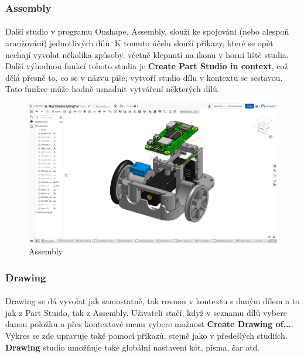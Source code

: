 \documentclass[12pt]{article}
\begin{document}
\begin{spacing}{1.5}
	\subsubsection*{Assembly}
	\paragraph{} Další studio v programu Onshape, Assembly, slouží ke spojování (nebo alespoň aranžování) jednotlivých dílů. K tomuto účelu slouží příkazy, které se opět nechají vyvolat několika způsoby, včetně klepnutí na ikonu v horní liště studia. Další výhodnou funkcí tohoto studia je \textbf{Create Part Studio in context}, což dělá přesně to, co se v názvu píše; vytvoří studio dílu v kontextu se sestavou. Tato funkce může hodně usnadnit vytváření některých dílů.
	
	\begin{figure}[H]
		\centering
		\includegraphics[width=\linewidth]{assembly_studio}
		\caption{Assembly}
		\label{fig:assembly_studio}
	\end{figure}
	
	\subsubsection*{Drawing}
	\paragraph{} Drawing se dá vyvolat jak samostatně, tak rovnou v kontextu s daným dílem a to jak z Part Stuido, tak z Assembly. Uživateli stačí, když v seznamu dílů vybere danou položku a přes kontextové menu vybere možnost \textbf{Create Drawing of...}. Výkres se zde upravuje také pomocí příkazů, stejně jako v předešlých studiích. \textbf{Drawing} studio umožňuje také globální nastavení kót, písma, čar atd.
	

\end{spacing}
\end{document}
